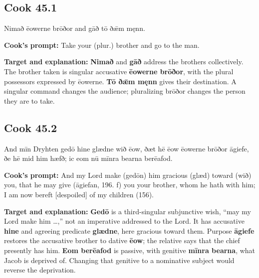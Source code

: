 \par\begin{minipage}{\linewidth}\raggedright
\subsection*{Cook 45.1}

Nimað ēowerne brōðor and gāð tō ðǣm męnn.

\textbf{Cook’s prompt:} Take your (plur.) brother and go to the man.

\textbf{Target and explanation:} \textbf{Nimað} and \textbf{gāð} address the brothers collectively. The brother taken is singular accusative \textbf{ēowerne brōðor}, with the plural possessors expressed by ēowerne. \textbf{Tō ðǣm męnn} gives their destination. A singular command changes the audience; pluralizing brōðor changes the person they are to take.

\end{minipage}\par\addvspace{4pt}

\par\begin{minipage}{\linewidth}\raggedright
\subsection*{Cook 45.2}

And mīn Dryhten gedō hine glædne wið ēow, ðæt hē ēow ēowerne brōðor āgiefe, ðe hē mid him hæfð; ic eom nū mīnra bearna berēafod.

\textbf{Cook’s prompt:} And my Lord make (gedōn) him gracious (glæd) toward (wið) you, that he may give (āgiefan, 196. f) you your brother, whom he hath with him; I am now bereft [despoiled] of my children (156).

\textbf{Target and explanation:} \textbf{Gedō} is a third-singular subjunctive wish, “may my Lord make him …,” not an imperative addressed to the Lord. It has accusative \textbf{hine} and agreeing predicate \textbf{glædne}, here gracious toward them. Purpose \textbf{āgiefe} restores the accusative brother to dative \textbf{ēow}; the relative says that the chief presently has him. \textbf{Eom berēafod} is passive, with genitive \textbf{mīnra bearna}, what Jacob is deprived of. Changing that genitive to a nominative subject would reverse the deprivation.

\end{minipage}\par\addvspace{4pt}

